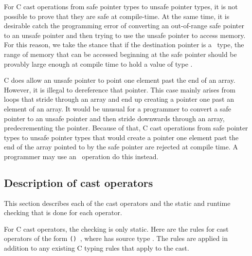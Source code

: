 For C cast operations from safe pointer types to unsafe pointer types,
it is not possible to prove that they are safe at compile-time.   At the same
time, it is desirable catch the programming error of converting an out-of-range
safe pointer to an unsafe pointer and then trying to use the unsafe
pointer to access memory.  For this reason, we take the stance that if the
destination pointer is a \unsafeptrT\ type, the range of memory that can be accessed
beginning at the safe pointer should be provably large enough at compile time 
to hold a value of type .

C does allow an unsafe pointer to point one element past the end of an array.
However, it is illegal to dereference that pointer.  This case mainly arises
from loops that stride through an array and end up creating a pointer one past
an element of an array.  It would be unusual for a programmer to
convert a safe pointer to an unsafe pointer and then stride downwards through an array, 
predecrementing the pointer.  Because of that, C cast operations from safe pointer
types to unsafe pointer types that would create a pointer one element past
the end of the array pointed to by the safe pointer are rejected at compile time.
A programmer may use an \assumeboundscast\ operation do this instead.

\subsection{Description of cast operators}

This section describes each of the cast operators and the static
and runtime checking that is done for each operator.   

For C cast operators, the checking is only static.
Here are the rules for cast operators of the form \texttt{() },
where  has source type .  The rules are applied in addition
to any existing C typing rules that apply to the cast.

